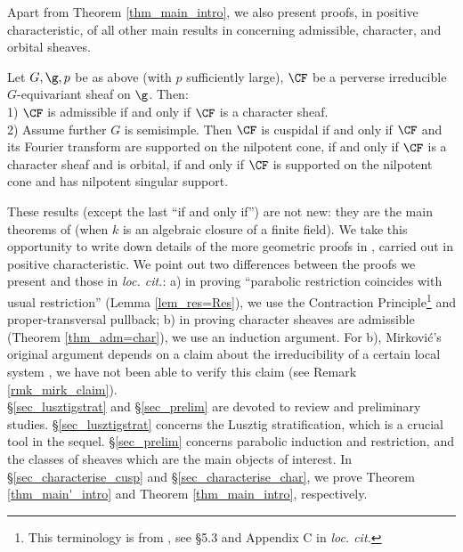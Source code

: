 Apart from Theorem \ref{thm_main_intro}, we also present proofs, in positive characteristic, of all other main results in \cite{mirkovic_character_2004} concerning admissible, character, and orbital sheaves.

\begin{theorem}[Theorems \ref{thm_characterise_cusp}, \ref{thm_adm=char}]\label{thm_main'_intro}
    Let $G, \g, p$ be as above (with $p$ sufficiently large), $\CF$ be a perverse irreducible $G$-equivariant sheaf on $\g$. Then:\\
    1) $\CF$ is admissible if and only if $\CF$ is a character sheaf.\\
    2) Assume further $G$ is semisimple. Then $\CF$ is cuspidal if and only if $\CF$ and its Fourier transform are supported on the nilpotent cone, if and only if $\CF$ is a character sheaf and is orbital, if and only if $\CF$ is supported on the nilpotent cone and has nilpotent singular support.
\end{theorem}

These results (except the last “if and only if”) are not new: they are the main theorems of \cite{lusztig_fourier_1987} (when $k$ is an algebraic closure of a finite field). We take this opportunity to write down details of the more geometric proofs in \cite{mirkovic_character_2004}, carried out in positive characteristic. We point out two differences between the proofs we present and those in \textit{loc. cit.}: a) in proving “parabolic restriction coincides with usual restriction” (Lemma \ref{lem_res=Res}), we use the Contraction Principle\footnote{This terminology is from \cite{drinfeld_compact_2015}, see §5.3 and Appendix C in \textit{loc. cit.}} and proper-transversal pullback; b) in proving character sheaves are admissible (Theorem \ref{thm_adm=char}), we use an induction argument. For b), Mirković's original argument depends on a claim about the irreducibility of a certain local system \cite[.ii]{mirkovic_character_2004}, we have not been able to verify this claim (see Remark \ref{rmk_mirk_claim}).\\


§\ref{sec_lusztigstrat} and §\ref{sec_prelim} are devoted to review and preliminary studies. §\ref{sec_lusztigstrat} concerns the Lusztig stratification, which is a crucial tool in the sequel. §\ref{sec_prelim} concerns parabolic induction and restriction, and the classes of sheaves which are the main objects of interest. In §\ref{sec_characterise_cusp} and §\ref{sec_characterise_char}, we prove Theorem \ref{thm_main'_intro} and Theorem \ref{thm_main_intro}, respectively.

